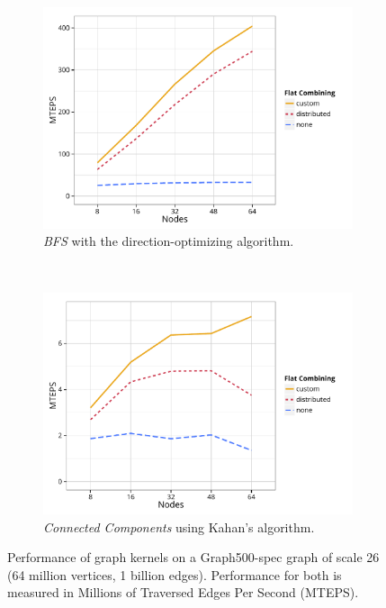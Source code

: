 \begin{figure}[t]
  \centering
  \begin{subfigure}{0.49\textwidth}
    \includegraphics[width=\textwidth]{data/plots/bfs_perf.pdf}
    \caption{\emph{BFS} with the direction-optimizing algorithm.}
    \label{fig:bfs_perf}
  \end{subfigure}
  ~
  \begin{subfigure}{0.49\textwidth}
    \includegraphics[width=\textwidth]{data/plots/cc_perf.pdf}
    \caption{\emph{Connected Components} using Kahan's algorithm.}
    \label{fig:cc_perf}
  \end{subfigure}
  \caption{Performance of graph kernels on a Graph500-spec graph of scale 26 (64 million vertices, 1 billion edges). Performance for both is measured in Millions of Traversed Edges Per Second (MTEPS).}
\end{figure}


